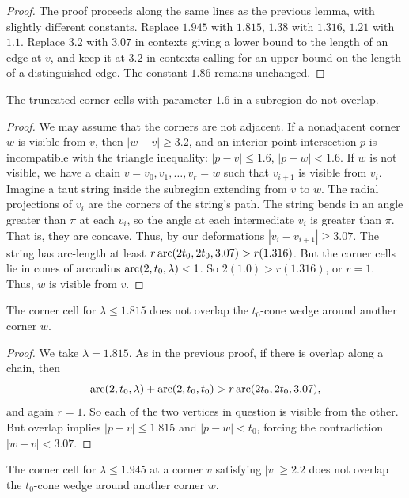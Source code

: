 \begin{proof}
The proof proceeds along the same lines as the previous lemma, with
slightly different constants. Replace $1.945$ with $1.815$, $1.38$ with
$1.316$, $1.21$ with $1.1$. Replace $3.2$ with $3.07$ in contexts giving
a lower bound to the length of an edge at $v$, and keep it at $3.2$ in
contexts calling for an upper bound on the length of a distinguished
edge. The constant $1.86$ remains unchanged.
\end{proof}

\begin{lemma}
The truncated corner cells with parameter $1.6$ in a subregion do not
overlap.
\end{lemma}

\begin{proof}
We may assume that the corners are not adjacent. If a nonadjacent
corner $w$ is visible from $v$, then $|w-v|\ge3.2$, and an
interior point intersection $p$ is incompatible with the triangle
inequality: $|p-v|\le 1.6$, $|p-w|<1.6$. If $w$ is not visible, we
have a chain $v=v_0,v_1,\ldots,v_r=w$ such that $v_{i+1}$ is
visible from $v_i$. Imagine a taut string inside the subregion
extending from $v$ to $w$. The radial projections of $v_i$ are the
corners of the string's path.   The string bends in an angle
greater than $\pi$ at each $v_i$, so the angle at each
intermediate $v_i$ is greater than $\pi$. That is, they are
concave. Thus, by our deformations $|v_i-v_{i+1}|\ge3.07$. The
string has arc-length at least $r \operatorname{arc}(2t_0,2t_0,3.07)>r (1.316)$.
But the corner cells lie in cones of arcradius
$\operatorname{arc}(2,t_0,\lambda)< 1$. So $2(1.0)>r(1.316)$, or $r=1$.  Thus,
$w$ is visible from $v$.
\end{proof}

\begin{lemma}
The corner cell for $\lambda \le 1.815$ does not overlap the $t_0$-cone
wedge around another corner $w$.
\end{lemma}

\begin{proof}
We take $\lambda=1.815$. As in the previous proof, if there is overlap
along a chain, then
    $$\operatorname{arc}(2,t_0,\lambda) +\operatorname{arc}(2,t_0,t_0) > r \operatorname{arc}(2t_0,2t_0,3.07),$$
and again $r=1$.  So each of the two vertices in question is visible
from the other. But overlap implies $|p-v|\le1.815$ and $|p-w|<t_0$,
forcing the contradiction $|w-v|<3.07$.
\end{proof}

\begin{lemma}
The corner cell for $\lambda \le 1.945$ at a corner $v$ satisfying
$|v|\ge2.2$ does not overlap the $t_0$-cone wedge around another corner
$w$.
\end{lemma}

